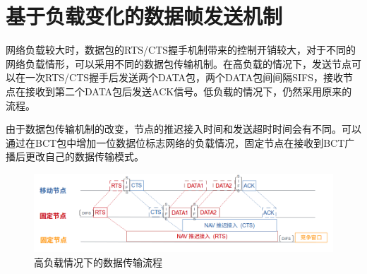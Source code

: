 \section {基于负载变化的数据帧发送机制}
网络负载较大时，数据包的RTS/CTS握手机制带来的控制开销较大，对于不同的网络负载情形，可以采用不同的数据包传输机制。在高负载的情况下，发送节点可以在一次RTS/CTS握手后发送两个DATA包，两个DATA包间间隔SIFS，接收节点在接收到第二个DATA包后发送ACK信号。低负载的情况下，仍然采用原来的流程。

由于数据包传输机制的改变，节点的推迟接入时间和发送超时时间会有不同。可以通过在BCT包中增加一位数据位标志网络的负载情况，固定节点在接收到BCT广播后更改自己的数据传输模式。
\begin{figure}[!ht]
	\centering
	\includegraphics[scale=0.4]{figures/highload.png}
	\caption{
		高负载情况下的数据传输流程
	}
	\label{fig:example}
\end{figure}



\endinput
